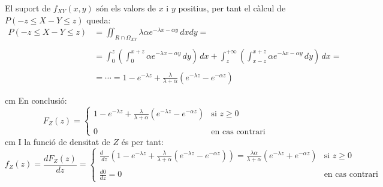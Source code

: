\documentclass{article}
\begin{document}
\noindent
El suport de $f_{XY}(x, y)$ s\'on els valors de $x$ i $y$ positius, per tant el c\`alcul de $P(-z \leq X-Y \leq z)$ queda:
\[
\begin{array}{ll}
P(-z \leq X-Y \leq z) & =\displaystyle \iint_{R \cap \Omega_{XY}} \lambda \alpha e^{-\lambda x - \alpha y} \, dxdy=\\ \\
 & = \displaystyle  \int_0^z \left( \int_0^{x+z} \alpha e^{-\lambda x - \alpha y} \, dy \right) \, dx +
\int_z^{+\infty} \left( \int_{x-z}^{x+z} \alpha e^{-\lambda x - \alpha y} \, dy \right) \, dx = \\ \\
 & = \cdots = 1-e^{-\lambda z} + \frac{\lambda}{\lambda + \alpha} (e^{-\lambda z} - e^{-\alpha z})
\end{array}
\]

 cm
\noindent
En conclusi\'o:
\[
F_Z(z)=\begin{cases} 
1-e^{-\lambda z} + \frac{\lambda}{\lambda + \alpha} (e^{-\lambda z} - e^{-\alpha z}) & \text{si } z \geq 0\\ \\
0 & \text{en cas contrari} \end{cases}
\]
 cm
\noindent
I la funci\'o de densitat de $Z$ \'es per tant:
\[
f_Z(z)=\frac{d F_Z(z)}{dz}=\begin{cases} 
\frac{d \quad}{dz} \left(  1-e^{-\lambda z} + \frac{\lambda}{\lambda + \alpha} (e^{-\lambda z} - e^{-\alpha z}) \right)
= \frac{\lambda \alpha}{\lambda + \alpha} (e^{-\lambda z} + e^{-\alpha z})
 & \text{si } z \geq 0\\ \\
\frac{d 0}{dz}=0 & \text{en cas contrari} \end{cases}
\]
\end{document}
